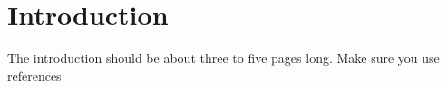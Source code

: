 \chapter{Introduction}
The introduction should be about three to five pages long.
Make sure you use references~\cite{einstein}